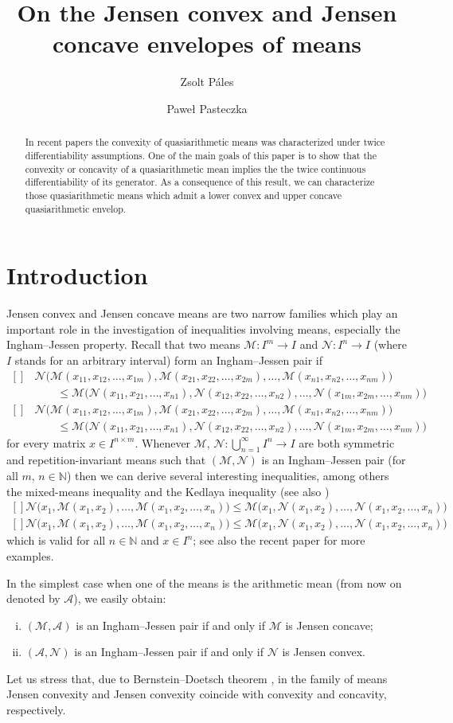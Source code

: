 \documentclass[12pt,oneside]{amsart}
\title
{On the Jensen convex and Jensen concave envelopes of means}
\author{Zsolt P\'ales}
\author{Pawe\l{} Pasteczka}
\theoremstyle{definition}
\numberwithin{equation}{section}
\def\Eq#1#2{\ifthenelse{\equal{#1}{*}}
  {\begin{equation*}\begin{aligned}[]#2\end{aligned}\end{equation*}}
  {\begin{equation}\begin{aligned}[]\label{#1}#2\end{aligned}\end{equation}}}
\def\A{\mathscr{A}}
\def\M{\mathscr{M}}
\def\Nm{\mathscr{N}}
\newcommand\N{\mathbb{N}}
\begin{document}
\begin{abstract}
In recent papers the convexity of quasiarithmetic means was characterized under twice differentiability assumptions. One of the main goals of this paper is to show that the convexity or concavity of a quasiarithmetic mean implies the the twice continuous differentiability of its generator. As a consequence of this result, we can characterize those quasiarithmetic means which admit a lower convex and upper concave quasiarithmetic envelop.
\end{abstract}
\maketitle


\section{Introduction}

Jensen convex and Jensen concave means are two narrow families which play an important role in the investigation of inequalities involving means, especially the Ingham--Jessen property. Recall that two means $\M \colon I^m \to I$ and $\Nm \colon I^n \to I$ (where $I$ stands for an arbitrary interval) form an Ingham--Jessen pair if 
\Eq{*}{
&\Nm \Big( \M(x_{11},x_{12},\dots,x_{1m}), \M(x_{21},x_{22},\dots,x_{2m}),\dots,\M(x_{n1},x_{n2},\dots,x_{nm}) \Big) \\
&\qquad\le \M \Big( \Nm(x_{11},x_{21},\dots,x_{n1}), \Nm(x_{12},x_{22},\dots,x_{n2}),\dots,\Nm(x_{1m},x_{2m},\dots,x_{nm}) \Big)
}
for every matrix $x \in I^{n\times m}$. Whenever $\M,\,\Nm\colon \bigcup_{n=1}^\infty I^n\to I$ are both symmetric and repetition-invariant means such that $(\M,\Nm)$ is an Ingham--Jessen pair (for all $m,\,n\in\N$) then we can derive several interesting inequalities, among others the mixed-means inequality \cite{CarMeaNel71,Sad06} and the Kedlaya inequality \cite{Ked94} (see also \cite{PalPas16})
\Eq{*}{
\Nm \Big( x_1, \M(x_1,x_2),\dots,\M(x_1,x_2,\dots,x_n) \Big) 
\le \M \Big( x_1,\Nm(x_1,x_2), \dots,\Nm(x_1,x_2,\dots,x_n) \Big)
}
which is valid for all $n \in\N$ and $x \in I^n$; see also the recent paper \cite{ChuPalPas19} for more examples.

In the simplest case when one of the means is the arithmetic mean (from now on denoted by $\A$), we easily obtain: 
\begin{enumerate}[(i)]
 \item $(\M,\A)$ is an Ingham--Jessen pair if and only if $\M$ is Jensen concave;
 \item $(\A,\Nm)$ is an Ingham--Jessen pair if and only if $\Nm$ is Jensen convex.
\end{enumerate}
Let us stress that, due to Bernstein--Doetsch theorem \cite{BerDoe15}, in the family of means Jensen convexity and Jensen convexity coincide with convexity and concavity, respectively.
\end{document}
